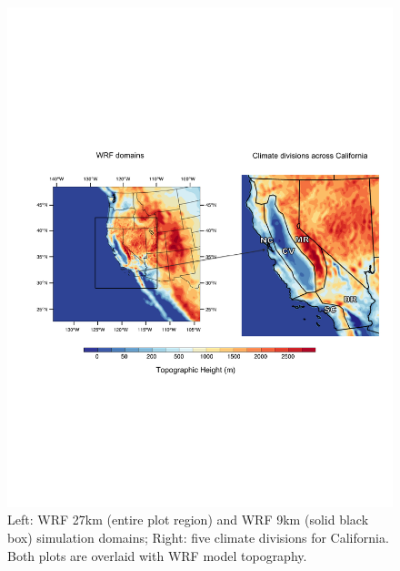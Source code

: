 \begin{figure}
\begin{center}
\includegraphics[width=6in]{wrf_domains.pdf}
\end{center}
\caption{Left: WRF 27km (entire plot region) and WRF 9km (solid black box) simulation domains; Right: five climate divisions for California.  Both plots are overlaid with WRF model topography.} \label{fig:Figure 3}
\end{figure}

